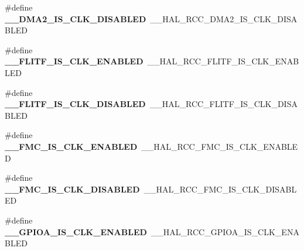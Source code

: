 \begin{DoxyCompactItemize}
\item 
\hypertarget{group___h_a_l___r_c_c___aliased_ga5343915fc6c9e81fe74c806bac95dc9c}{\#define {\bfseries \-\_\-\-\_\-\-D\-M\-A2\-\_\-\-I\-S\-\_\-\-C\-L\-K\-\_\-\-D\-I\-S\-A\-B\-L\-E\-D}~\-\_\-\-\_\-\-H\-A\-L\-\_\-\-R\-C\-C\-\_\-\-D\-M\-A2\-\_\-\-I\-S\-\_\-\-C\-L\-K\-\_\-\-D\-I\-S\-A\-B\-L\-E\-D}\label{group___h_a_l___r_c_c___aliased_ga5343915fc6c9e81fe74c806bac95dc9c}

\item 
\hypertarget{group___h_a_l___r_c_c___aliased_gaecf13d120c8b030d3b71ad688fd79518}{\#define {\bfseries \-\_\-\-\_\-\-F\-L\-I\-T\-F\-\_\-\-I\-S\-\_\-\-C\-L\-K\-\_\-\-E\-N\-A\-B\-L\-E\-D}~\-\_\-\-\_\-\-H\-A\-L\-\_\-\-R\-C\-C\-\_\-\-F\-L\-I\-T\-F\-\_\-\-I\-S\-\_\-\-C\-L\-K\-\_\-\-E\-N\-A\-B\-L\-E\-D}\label{group___h_a_l___r_c_c___aliased_gaecf13d120c8b030d3b71ad688fd79518}

\item 
\hypertarget{group___h_a_l___r_c_c___aliased_ga2421872586051f72784338c03da58492}{\#define {\bfseries \-\_\-\-\_\-\-F\-L\-I\-T\-F\-\_\-\-I\-S\-\_\-\-C\-L\-K\-\_\-\-D\-I\-S\-A\-B\-L\-E\-D}~\-\_\-\-\_\-\-H\-A\-L\-\_\-\-R\-C\-C\-\_\-\-F\-L\-I\-T\-F\-\_\-\-I\-S\-\_\-\-C\-L\-K\-\_\-\-D\-I\-S\-A\-B\-L\-E\-D}\label{group___h_a_l___r_c_c___aliased_ga2421872586051f72784338c03da58492}

\item 
\hypertarget{group___h_a_l___r_c_c___aliased_gaefae2949238ac20c67f33302c39bc53e}{\#define {\bfseries \-\_\-\-\_\-\-F\-M\-C\-\_\-\-I\-S\-\_\-\-C\-L\-K\-\_\-\-E\-N\-A\-B\-L\-E\-D}~\-\_\-\-\_\-\-H\-A\-L\-\_\-\-R\-C\-C\-\_\-\-F\-M\-C\-\_\-\-I\-S\-\_\-\-C\-L\-K\-\_\-\-E\-N\-A\-B\-L\-E\-D}\label{group___h_a_l___r_c_c___aliased_gaefae2949238ac20c67f33302c39bc53e}

\item 
\hypertarget{group___h_a_l___r_c_c___aliased_gab4d825237a2dcaa1179a16c49ece626c}{\#define {\bfseries \-\_\-\-\_\-\-F\-M\-C\-\_\-\-I\-S\-\_\-\-C\-L\-K\-\_\-\-D\-I\-S\-A\-B\-L\-E\-D}~\-\_\-\-\_\-\-H\-A\-L\-\_\-\-R\-C\-C\-\_\-\-F\-M\-C\-\_\-\-I\-S\-\_\-\-C\-L\-K\-\_\-\-D\-I\-S\-A\-B\-L\-E\-D}\label{group___h_a_l___r_c_c___aliased_gab4d825237a2dcaa1179a16c49ece626c}

\item 
\hypertarget{group___h_a_l___r_c_c___aliased_gae1b665ed35a5cbc7919caa954c030fc7}{\#define {\bfseries \-\_\-\-\_\-\-G\-P\-I\-O\-A\-\_\-\-I\-S\-\_\-\-C\-L\-K\-\_\-\-E\-N\-A\-B\-L\-E\-D}~\-\_\-\-\_\-\-H\-A\-L\-\_\-\-R\-C\-C\-\_\-\-G\-P\-I\-O\-A\-\_\-\-I\-S\-\_\-\-C\-L\-K\-\_\-\-E\-N\-A\-B\-L\-E\-D}\label{group___h_a_l___r_c_c___aliased_gae1b665ed35a5cbc7919caa954c030fc7}


\end{DoxyCompactItemize}
